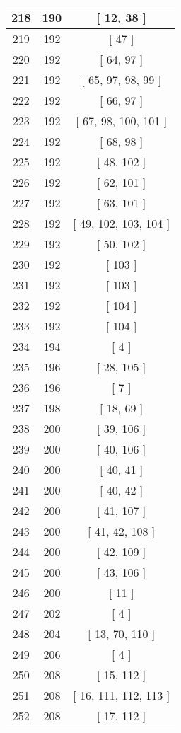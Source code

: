 \begin{center}
\begin{longtable}[H]{|| c c c ||}
\hline
218 & 190 & [ 12, 38 ] \\ 
\hline
219 & 192 & [ 47 ] \\ 
\hline
220 & 192 & [ 64, 97 ] \\ 
\hline
221 & 192 & [ 65, 97, 98, 99 ] \\ 
\hline
222 & 192 & [ 66, 97 ] \\ 
\hline
223 & 192 & [ 67, 98, 100, 101 ] \\ 
\hline
224 & 192 & [ 68, 98 ] \\ 
\hline
225 & 192 & [ 48, 102 ] \\ 
\hline
226 & 192 & [ 62, 101 ] \\ 
\hline
227 & 192 & [ 63, 101 ] \\ 
\hline
228 & 192 & [ 49, 102, 103, 104 ] \\ 
\hline
229 & 192 & [ 50, 102 ] \\ 
\hline
230 & 192 & [ 103 ] \\ 
\hline
231 & 192 & [ 103 ] \\ 
\hline
232 & 192 & [ 104 ] \\ 
\hline
233 & 192 & [ 104 ] \\ 
\hline
234 & 194 & [ 4 ] \\ 
\hline
235 & 196 & [ 28, 105 ] \\ 
\hline
236 & 196 & [ 7 ] \\ 
\hline
237 & 198 & [ 18, 69 ] \\ 
\hline
238 & 200 & [ 39, 106 ] \\ 
\hline
239 & 200 & [ 40, 106 ] \\ 
\hline
240 & 200 & [ 40, 41 ] \\ 
\hline
241 & 200 & [ 40, 42 ] \\ 
\hline
242 & 200 & [ 41, 107 ] \\ 
\hline
243 & 200 & [ 41, 42, 108 ] \\ 
\hline
244 & 200 & [ 42, 109 ] \\ 
\hline
245 & 200 & [ 43, 106 ] \\ 
\hline
246 & 200 & [ 11 ] \\ 
\hline
247 & 202 & [ 4 ] \\ 
\hline
248 & 204 & [ 13, 70, 110 ] \\ 
\hline
249 & 206 & [ 4 ] \\ 
\hline
250 & 208 & [ 15, 112 ] \\ 
\hline
251 & 208 & [ 16, 111, 112, 113 ] \\ 
\hline
252 & 208 & [ 17, 112 ] \\ 

\end{longtable}
\end{center}
